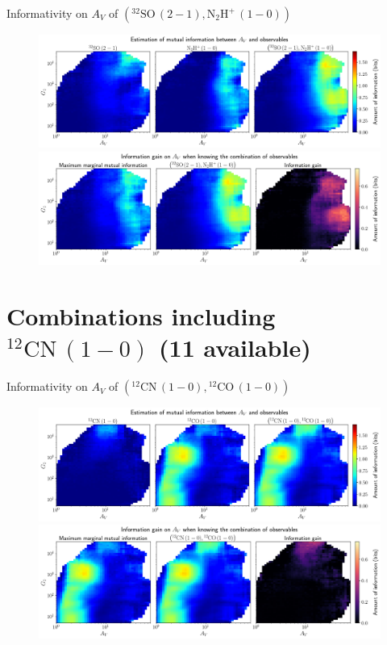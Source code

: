 \documentclass{beamer}
\begin{document}
\begin{frame}{Informativity on $A_V$ of $\left(\mathrm{^{32}SO\,(2-1)},\mathrm{N_2H^+\,(1-0)}\right)$}
    \begin{figure}
        \centering
        \includegraphics[width=0.95\linewidth]{../mi/av__32so21_n2hp10_mi.png}
        \vfill
        \includegraphics[width=0.95\linewidth]{../mi/av__32so21_n2hp10_mi_gain.png}
    \end{figure}
\end{frame}

\section{Combinations including $\mathrm{^{12}CN\,(1-0)}$ (11 available)}

\begin{frame}{Informativity on $A_V$ of $\left(\mathrm{^{12}CN\,(1-0)},\mathrm{^{12}CO\,(1-0)}\right)$}
    \begin{figure}
        \centering
        \includegraphics[width=0.95\linewidth]{../mi/av__12cn10_12co10_mi.png}
        \vfill
        \includegraphics[width=0.95\linewidth]{../mi/av__12cn10_12co10_mi_gain.png}
    \end{figure}
\end{frame}
\end{document}

